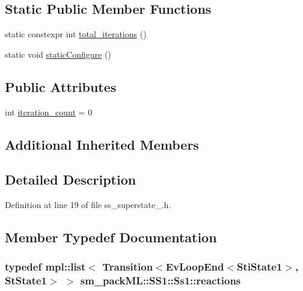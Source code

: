 \subsection*{Static Public Member Functions}
\begin{DoxyCompactItemize}
\item 
static constexpr int \hyperlink{structsm__packML_1_1SS1_1_1Ss1_a2a475a2d1777573f55de08923b1c9816}{total\+\_\+iterations} ()
\item 
static void \hyperlink{structsm__packML_1_1SS1_1_1Ss1_a37c64d94b19e5522a60c4e47cbd4a3a0}{static\+Configure} ()
\end{DoxyCompactItemize}
\subsection*{Public Attributes}
\begin{DoxyCompactItemize}
\item 
int \hyperlink{structsm__packML_1_1SS1_1_1Ss1_a849076870adaf8bbb9a1b25a8a9c210f}{iteration\+\_\+count} = 0
\end{DoxyCompactItemize}
\subsection*{Additional Inherited Members}


\subsection{Detailed Description}


Definition at line 19 of file ss\+\_\+superstate\+\_.\+h.



\subsection{Member Typedef Documentation}
\subsubsection[{\texorpdfstring{reactions}{reactions}}]{\setlength{\rightskip}{0pt plus 5cm}typedef mpl\+::list$<$ Transition$<$Ev\+Loop\+End$<${\bf Sti\+State1}$>$, {\bf St\+State1}$>$ $>$ {\bf sm\+\_\+pack\+M\+L\+::\+S\+S1\+::\+Ss1\+::reactions}}\hypertarget{structsm__packML_1_1SS1_1_1Ss1_af899976915a8923aa41bc182736857bd}{}\label{structsm__packML_1_1SS1_1_1Ss1_af899976915a8923aa41bc182736857bd}


